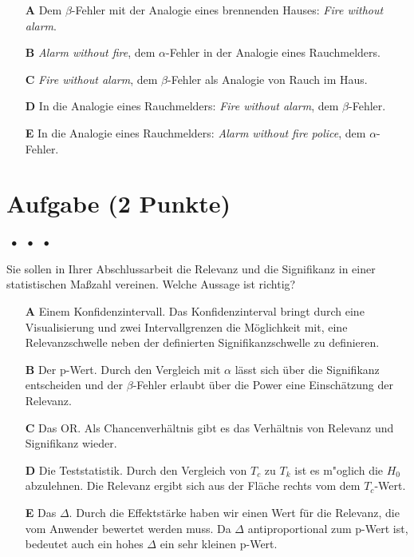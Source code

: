 \documentclass[a4paper, 9pt]{scrartcl}\usepackage[]{graphicx}\usepackage[]{xcolor}
\begin{document}
\begin{enumerate}
\item [\textbf{A} \msquare] Dem $\beta$-Fehler mit der Analogie eines brennenden Hauses: \textit{Fire without alarm}.
\item [\textbf{B} \msquare] \textit{Alarm without fire}, dem $\alpha$-Fehler in der Analogie eines Rauchmelders.
\item [\textbf{C} \msquare] \textit{Fire without alarm}, dem $\beta$-Fehler als Analogie von Rauch im Haus.
\item [\textbf{D} \msquare] In die Analogie eines Rauchmelders: \textit{Fire without alarm}, dem $\beta$-Fehler.
\item [\textbf{E} \msquare] In die Analogie eines Rauchmelders: \textit{Alarm without fire police}, dem $\alpha$-Fehler.
\end{enumerate}

\section{Aufgabe \hfill (2 Punkte)}

\ifcollection
\begin{flushright}
\tiny\vspace{-2Ex}
\textbf{\examinhaltstart}
\exammodulestat $\;\bullet$
\exammodulestatbbv $\;\bullet$
\exammodulestatversuch $\;\bullet$
\exammodulebiostat
\vspace{-1Ex}
\end{flushright}
\fi




Sie sollen in Ihrer Abschlussarbeit die Relevanz und die Signifikanz in einer statistischen Maßzahl vereinen. Welche Aussage ist richtig?



\begin{enumerate}
\item [\textbf{A} \msquare] Einem Konfidenzintervall. Das Konfidenzinterval bringt durch eine Visualisierung und zwei Intervallgrenzen die Möglichkeit mit, eine Relevanzschwelle neben der definierten Signifikanzschwelle zu definieren.
\item [\textbf{B} \msquare] Der p-Wert. Durch den Vergleich mit $\alpha$ lässt sich über die Signifikanz entscheiden und der $\beta$-Fehler erlaubt über die Power eine Einschätzung der Relevanz.
\item [\textbf{C} \msquare] Das OR. Als Chancenverhältnis gibt es das Verhältnis von Relevanz und Signifikanz wieder.
\item [\textbf{D} \msquare] Die Teststatistik. Durch den Vergleich von $T_c$ zu $T_k$ ist es m{"o}glich die $H_0$ abzulehnen. Die Relevanz ergibt sich aus der Fläche rechts vom dem $T_c$-Wert.
\item [\textbf{E} \msquare] Das $\Delta$. Durch die Effektstärke haben wir einen Wert für die Relevanz, die vom Anwender bewertet werden muss. Da $\Delta$ antiproportional zum p-Wert ist, bedeutet auch ein hohes $\Delta$ ein sehr kleinen p-Wert.
\end{enumerate}
\end{document}
